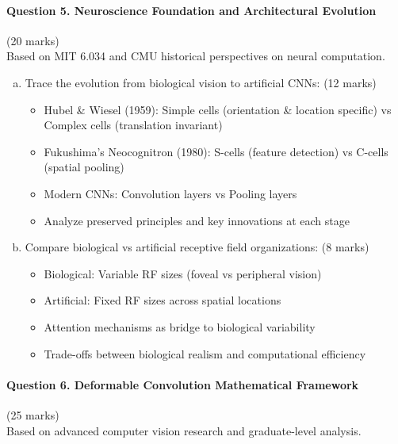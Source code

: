 \documentclass[12pt]{article}
\newcommand{\mediumanswer}{\vspace{3cm}}
\begin{document}
\newpage
\paragraph{Question 5. Neuroscience Foundation and Architectural Evolution}{{\hfill (20 marks)}}\\
Based on MIT 6.034 and CMU historical perspectives on neural computation.

\begin{enumerate}[(a)]
    \item Trace the evolution from biological vision to artificial CNNs: \hfill (12 marks)
    \begin{itemize}
        \item Hubel \& Wiesel (1959): Simple cells (orientation \& location specific) vs Complex cells (translation invariant)
        \item Fukushima's Neocognitron (1980): S-cells (feature detection) vs C-cells (spatial pooling)
        \item Modern CNNs: Convolution layers vs Pooling layers
        \item Analyze preserved principles and key innovations at each stage
    \end{itemize}
    
    \mediumanswer
    
    \item Compare biological vs artificial receptive field organizations: \hfill (8 marks)
    \begin{itemize}
        \item Biological: Variable RF sizes (foveal vs peripheral vision)
        \item Artificial: Fixed RF sizes across spatial locations
        \item Attention mechanisms as bridge to biological variability
        \item Trade-offs between biological realism and computational efficiency
    \end{itemize}
    
    \mediumanswer
\end{enumerate}

\newpage
\paragraph{Question 6. Deformable Convolution Mathematical Framework}{{\hfill (25 marks)}}\\
Based on advanced computer vision research and graduate-level analysis.
\end{document}
